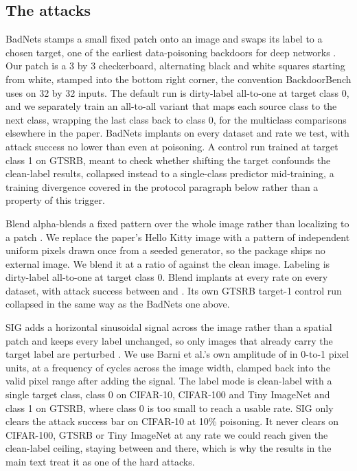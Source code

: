 \subsection{The attacks}
\label{app:attacks}

BadNets stamps a small fixed patch onto an image and swaps its label to a chosen target, one of the earliest data-poisoning backdoors for deep networks \cite{gu2017badnets}. Our patch is a 3 by 3 checkerboard, alternating black and white squares starting from white, stamped into the bottom right corner, the convention BackdoorBench uses on 32 by 32 inputs. The default run is dirty-label all-to-one at target class 0, and we separately train an all-to-all variant that maps each source class to the next class, wrapping the last class back to class 0, for the multiclass comparisons elsewhere in the paper. BadNets implants on every dataset and rate we test, with attack success no lower than \AttackBadnetATwooAsrMin{} even at \PanelRateLow{} poisoning. A control run trained at target class 1 on GTSRB, meant to check whether shifting the target confounds the clean-label results, collapsed instead to a single-class predictor mid-training, a training divergence covered in the protocol paragraph below rather than a property of this trigger.

Blend alpha-blends a fixed pattern over the whole image rather than localizing to a patch \cite{chen2017targeted}. We replace the paper's Hello Kitty image with a pattern of independent uniform pixels drawn once from a seeded generator, so the package ships no external image. We blend it at a ratio of \AttackBlendAlpha{} against the clean image. Labeling is dirty-label all-to-one at target class 0. Blend implants at every rate on every dataset, with attack success between \AttackBlendAsrMin{} and \AttackBlendAsrMax{}. Its own GTSRB target-1 control run collapsed in the same way as the BadNets one above.

SIG adds a horizontal sinusoidal signal across the image rather than a spatial patch and keeps every label unchanged, so only images that already carry the target label are perturbed \cite{barni2019sig}. We use Barni et al.'s own amplitude of \AttackSigAmplitude{} in 0-to-1 pixel units, at a frequency of \AttackSigFrequency{} cycles across the image width, clamped back into the valid pixel range after adding the signal. The label mode is clean-label with a single target class, class 0 on CIFAR-10, CIFAR-100 and Tiny ImageNet and class 1 on GTSRB, where class 0 is too small to reach a usable rate. SIG only clears the attack success bar on CIFAR-10 at 10\% poisoning. It never clears on CIFAR-100, GTSRB or Tiny ImageNet at any rate we could reach given the clean-label ceiling, staying between \AttackSigAsrNeverClearingMin{} and \AttackSigAsrNeverClearingMax{} there, which is why the results in the main text treat it as one of the hard attacks.

